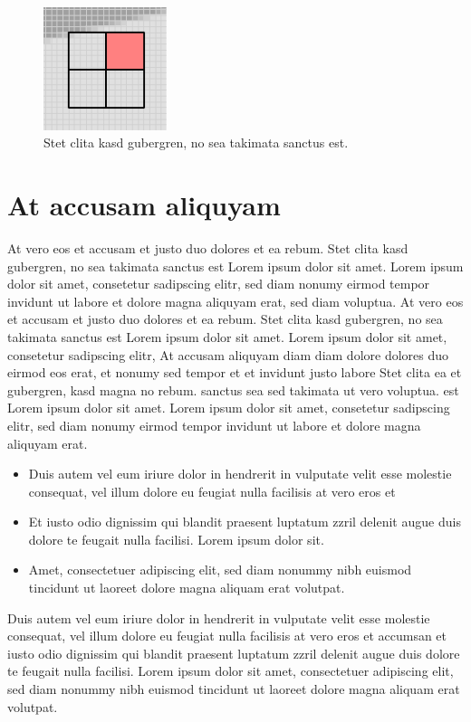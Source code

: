 \begin{figure}
    \centering%
    \includegraphics[width=0.32\textwidth]{graphics/test0}
    \caption{Stet clita kasd gubergren, no sea takimata sanctus est.}
\end{figure}


\section{At accusam aliquyam}
At vero eos et accusam et justo duo dolores et ea rebum. Stet clita kasd gubergren, no sea takimata sanctus est Lorem ipsum dolor sit amet. Lorem ipsum dolor sit amet, consetetur sadipscing elitr, sed diam nonumy eirmod tempor invidunt ut labore et dolore magna aliquyam erat, sed diam voluptua. At vero eos et accusam et justo duo dolores et ea rebum. Stet clita kasd gubergren, no sea takimata sanctus est Lorem ipsum dolor sit amet. Lorem ipsum dolor sit amet, consetetur sadipscing elitr, At accusam aliquyam diam diam dolore dolores duo eirmod eos erat, et nonumy sed tempor et et invidunt justo labore Stet clita ea et gubergren, kasd magna no rebum. sanctus sea sed takimata ut vero voluptua. est Lorem ipsum dolor sit amet. Lorem ipsum dolor sit amet, consetetur sadipscing elitr, sed diam nonumy eirmod tempor invidunt ut labore et dolore magna aliquyam erat.
\begin{itemize}
\item Duis autem vel eum iriure dolor in hendrerit in vulputate velit esse molestie consequat, vel illum dolore eu feugiat nulla facilisis at vero eros et
\item Et iusto odio dignissim qui blandit praesent luptatum zzril delenit augue duis dolore te feugait nulla facilisi. Lorem ipsum dolor sit.
\item Amet, consectetuer adipiscing elit, sed diam nonummy nibh euismod tincidunt ut laoreet dolore magna aliquam erat volutpat.
\end{itemize}


Duis autem vel eum iriure dolor in hendrerit in vulputate velit esse molestie consequat, vel illum dolore eu feugiat nulla facilisis at vero eros et accumsan et iusto odio dignissim qui blandit praesent luptatum zzril delenit augue duis dolore te feugait nulla facilisi. Lorem ipsum dolor sit amet, consectetuer adipiscing elit, sed diam nonummy nibh euismod tincidunt ut laoreet dolore magna aliquam erat volutpat.

